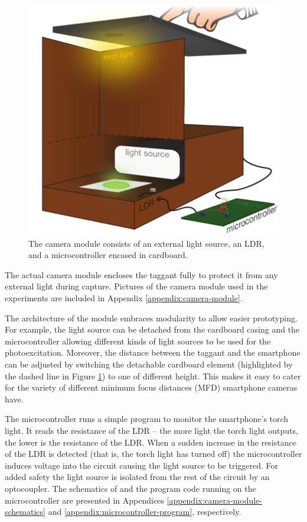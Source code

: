 \documentclass[thesis.tex]{subfiles}
\begin{document}
\begin{figure}[h]
\centering \includegraphics[width=13cm]{images/design_implementation/camera_module.pdf}
\caption{The camera module consists of an external light source, an LDR, and a microcontroller encased in cardboard. \label{figure:camera_module}}
\end{figure}

The actual camera module encloses the taggant fully to protect it from any external light during capture. Pictures of the camera module used in the experiments are included in Appendix \ref{appendix:camera-module}.

The architecture of the module embraces modularity to allow easier prototyping. For example, the light source can be detached from the cardboard casing and the microcontroller allowing different kinds of light sources to be used for the photoexcitation. Moreover, the distance between the taggant and the smartphone can be adjusted by switching the detachable cardboard element (highlighted by the dashed line in Figure \ref{figure:camera_module}) to one of different height. This makes it easy to cater for the variety of different minimum focus distances (MFD) smartphone cameras have.

The microcontroller runs a simple program to monitor the smartphone's torch light. It reads the resistance of the LDR -- the more light the torch light outputs, the lower is the resistance of the LDR. When a sudden increase in the resistance of the LDR is detected (that is, the torch light has turned off) the microcontroller induces voltage into the circuit causing the light source to be triggered. For added safety the light source is isolated from the rest of the circuit by an optocoupler. The schematics of and the program code running on the microcontroller are presented in Appendices \ref{appendix:camera-module-schematics} and \ref{appendix:microcontroller-program}, respectively.
\end{document}
